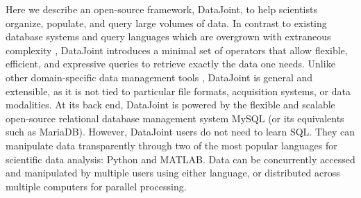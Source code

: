 Here we describe an open-source framework, DataJoint, to help scientists organize, populate, and query large volumes of data.
In contrast to existing database systems and query languages which are overgrown with extraneous complexity \cite{date_sql_2011,manyam_relax_2012},
DataJoint introduces a minimal set of operators that allow flexible, efficient, and expressive queries to retrieve exactly the data one needs.
Unlike other domain-specific data management tools \cite{manyam_relax_2012, gunay_database_2009, schutter_review_2009, small_database-managed_2009, brown_overview_2010, shi_synapticdb_2011, pittendrigh_neurosys_2003}, DataJoint is general and extensible, as it is not tied to particular file formats, acquisition systems, or data modalities.
At its back end, DataJoint is powered by the flexible and scalable open-source relational database management system MySQL (or its equivalents such as MariaDB).
However, DataJoint users do not need to learn SQL. They can manipulate data transparently through two of the most popular languages for scientific data analysis: Python and MATLAB.
Data can be concurrently accessed and manipulated by multiple users using either language, or distributed across multiple computers for parallel processing.
